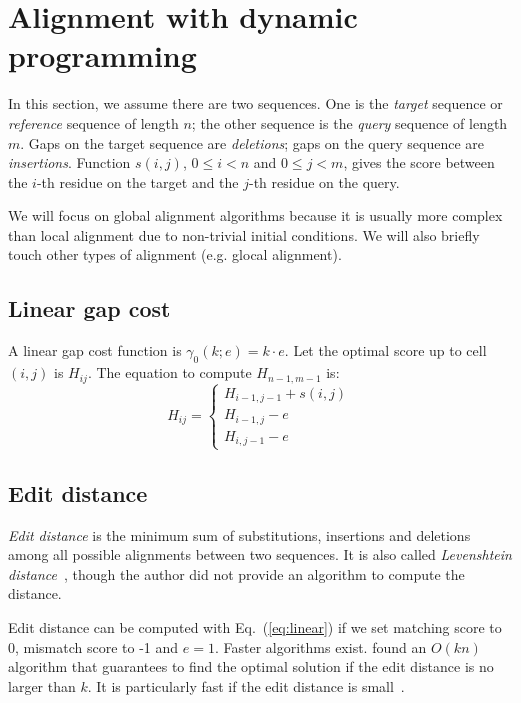 \documentclass{bioinfo}
\begin{document}
\section{Alignment with dynamic programming}

In this section, we assume there are two sequences. One is the \emph{target}
sequence or \emph{reference} sequence of length $n$; the other sequence is the
\emph{query} sequence of length $m$. Gaps on the target sequence are
\emph{deletions}; gaps on the query sequence are \emph{insertions}. Function
$s(i,j)$, $0\le i<n$ and $0\le j<m$, gives the score between the $i$-th residue
on the target and the $j$-th residue on the query.

We will focus on global alignment algorithms because it is usually more complex
than local alignment due to non-trivial initial conditions. We will also
briefly touch other types of alignment (e.g. glocal alignment).

\subsection{Linear gap cost}

A linear gap cost function is $\gamma_0(k;e)=k\cdot e$. Let the optimal score up
to cell $(i,j)$ is $H_{ij}$. The equation to compute $H_{n-1,m-1}$ is:
\begin{equation}\label{eq:linear}
H_{ij}=\left\{\begin{array}{l}
H_{i-1,j-1}+s(i,j) \\
H_{i-1,j}-e \\
H_{i,j-1}-e
\end{array}\right.
\end{equation}

\subsection{Edit distance}

\emph{Edit distance} is the minimum sum of substitutions, insertions and
deletions among all possible alignments between two sequences. It is also
called \emph{Levenshtein distance}~\citep{Levenshtein:1966aa}, though the
author did not provide an algorithm to compute the distance.

Edit distance can be computed with Eq.~(\ref{eq:linear}) if we set matching
score to 0, mismatch score to -1 and $e=1$. Faster algorithms exist.
\citet{Landau:1986aa} found an $O(kn)$ algorithm that guarantees to find
the optimal solution if the edit distance is no larger than $k$. It is
particularly fast if the edit distance is small~\citep{Sosic:2015aa}.
\end{document}
